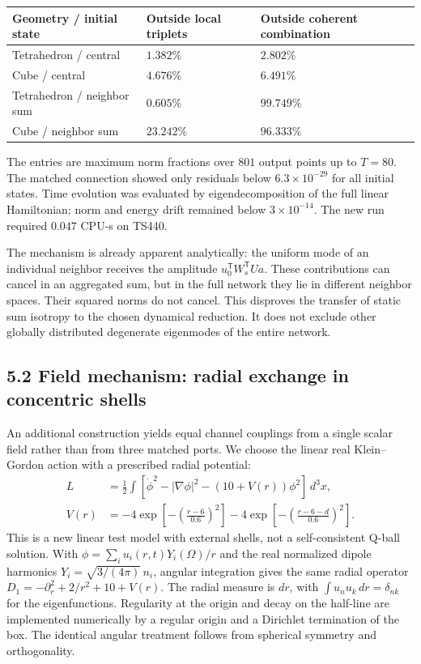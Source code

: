 \documentclass[a4paper,11pt]{article}
\newenvironment{drafttable}{\begin{center}\small\renewcommand{\arraystretch}{1.2}}{\end{center}}
\begin{document}
\begin{drafttable}
\begin{tabularx}{\linewidth}{@{}XXX@{}}\toprule
Geometry / initial state & Outside local triplets & Outside coherent combination\\\midrule
Tetrahedron / central & $1.382\%$ & $2.802\%$\\
Cube / central & $4.676\%$ & $6.491\%$\\
Tetrahedron / neighbor sum & $0.605\%$ & $99.749\%$\\
Cube / neighbor sum & $23.242\%$ & $96.333\%$\\\bottomrule
\end{tabularx}
\end{drafttable}
The entries are maximum norm fractions over $801$ output points up to $T=80$. The matched connection showed only residuals below $6.3\times10^{-29}$ for all initial states. Time evolution was evaluated by eigendecomposition of the full linear Hamiltonian; norm and energy drift remained below $3\times10^{-14}$. The new run required $0.047$ CPU-s on TS440.

The mechanism is already apparent analytically: the uniform mode of an individual neighbor receives the amplitude $u_0^{\mathsf T}W_s^{\mathsf T}Ua$. These contributions can cancel in an aggregated sum, but in the full network they lie in different neighbor spaces. Their squared norms do not cancel. This disproves the transfer of static sum isotropy to the chosen dynamical reduction. It does not exclude other globally distributed degenerate eigenmodes of the entire network.

\subsection*{5.2 Field mechanism: radial exchange in concentric shells}
An additional construction yields equal channel couplings from a single scalar field rather than from three matched ports. We choose the linear real Klein--Gordon action with a prescribed radial potential:
\begin{equation}
\begin{aligned}
L&=\frac12\int[\dot\phi^2-|\nabla\phi|^2-(10+V(r))\phi^2]\,d^3x,\\
V(r)&=-4\exp\left[-\left(\frac{r-6}{0.6}\right)^2\right]
-4\exp\left[-\left(\frac{r-6-d}{0.6}\right)^2\right].
\end{aligned}\tag{11}
\end{equation}
This is a new linear test model with external shells, not a self-consistent Q-ball solution. With $\phi=\sum_i u_i(r,t)Y_i(\Omega)/r$ and the real normalized dipole harmonics $Y_i=\sqrt{3/(4\pi)}\,n_i$, angular integration gives the same radial operator $D_1=-\partial_r^2+2/r^2+10+V(r)$. The radial measure is $dr$, with $\int u_nu_k\,dr=\delta_{nk}$ for the eigenfunctions. Regularity at the origin and decay on the half-line are implemented numerically by a regular origin and a Dirichlet termination of the box. The identical angular treatment follows from spherical symmetry and orthogonality.
\end{document}
